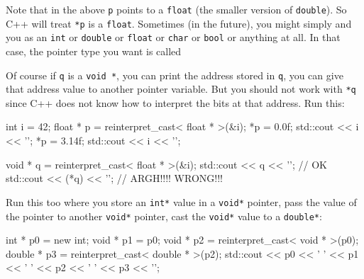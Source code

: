 \begin{consolethree}[escapeinside=||]
Note that in the above \texttt{p} points to a \texttt{float} (the smaller version of \texttt{double}). So C++ will treat \texttt{*p} is a \texttt{float}. Sometimes (in the future), you might simply  and you  as an \texttt{int} or \texttt{double} or \texttt{float} or \texttt{char} or \texttt{bool} or anything at all. In that case, the pointer type you want is called

\begin{center}
\end{center}

Of course if \texttt{q} is a \texttt{void *}, you can print the address
stored in \texttt{q}, you can give that address value to another pointer
variable. But you should not work with \texttt{*q} since C++ does not know
how to interpret the bits at that address. Run this:

\begin{console}
int i = 42;
float * p = reinterpret_cast< float * >(&i);
*p = 0.0f;
std::cout << i << '\n';
*p = 3.14f;
std::cout << i << '\n';

void * q = reinterpret_cast< float * >(&i);
std::cout << q << '\n';    // OK
std::cout << (*q) << '\n'; // ARGH!!!! WRONG!!!
\end{console}

Run this too where you store an \texttt{int*} value in a \texttt{void*} pointer, pass the value of the pointer to another \texttt{void*} pointer, cast the \texttt{void*} value to a \texttt{double*}:

\begin{console}
int * p0 = new int;
void * p1 = p0;
void * p2 = reinterpret_cast< void * >(p0);
double * p3 = reinterpret_cast< double * >(p2);
std::cout << p0 << ' ' << p1 << ' ' << p2 << ' '
          << p3 << '\n';
\end{console}


\end{consolethree}
